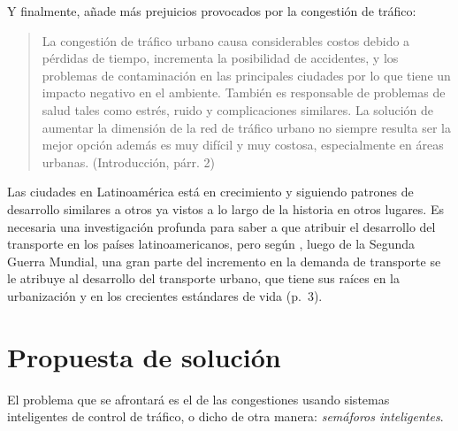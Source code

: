 Y finalmente, \parencite{JoelTrejo2006} añade más prejuicios provocados
por la congestión de tráfico:

\begin{quote}
La congestión de tráfico urbano causa considerables costos debido a
pérdidas de tiempo, incrementa la posibilidad de accidentes, y los
problemas de contaminación en las principales ciudades por lo que tiene
un impacto negativo en el ambiente. También es responsable de problemas
de salud tales como estrés, ruido y complicaciones similares. La
solución de aumentar la dimensión de la red de tráfico urbano no siempre
resulta ser la mejor opción además es muy difícil y muy costosa,
especialmente en áreas urbanas. (Introducción, párr. 2)
\end{quote}

Las ciudades en Latinoamérica está en crecimiento y siguiendo patrones
de desarrollo similares a otros ya vistos a lo largo de la historia en
otros lugares. Es necesaria una investigación profunda para saber a que
atribuir el desarrollo del transporte en los países latinoamericanos,
pero según \parencite{Patriksson2012}, luego de la Segunda Guerra
Mundial, una gran parte del incremento en la demanda de transporte se le
atribuye al desarrollo del transporte urbano, que tiene sus raíces en la
urbanización y en los crecientes estándares de vida (p.~3).

\hypertarget{propuesta-de-soluciuxf3n}{%
\section{Propuesta de solución}\label{propuesta-de-soluciuxf3n}}

El problema que se afrontará es el de las congestiones usando sistemas
inteligentes de control de tráfico, o dicho de otra manera:
\emph{semáforos inteligentes}.

